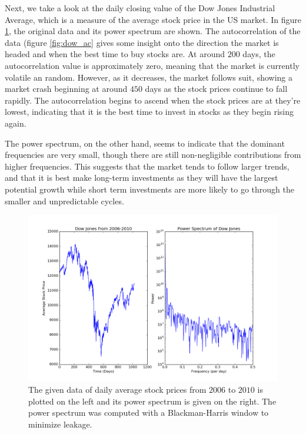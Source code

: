 \documentclass[twocolumn]{article}
\begin{document}
Next, we take a look at the daily closing value of the Dow Jones
Industrial Average, which is a measure of the average stock price in
the US market. In figure \ref{fig:dow}, the original data and its
power spectrum are shown. The autocorrelation of the data (figure
\ref{fig:dow_ac} gives some insight onto the direction the market is
headed and when the best time to buy stocks are. At around $200$ days,
the autocorrelation value is approximately zero, meaning that the
market is currently volatile an random. However, as it decreases, the
market follows suit, showing a market crash beginning at around $450$
days as the stock prices continue to fall rapidly. The autocorrelation
begins to ascend when the stock prices are at they're lowest,
indicating that it is the best time to invest in stocks as they begin
rising again.

The power spectrum, on the other hand, seems to indicate
that the dominant frequencies are very small, though there are still
non-negligible contributions from higher frequencies. This suggests
that the market tends to follow larger trends, and that it is best
make long-term investments as they will have the largest potential
growth while short term investments are more likely to go through the
smaller and unpredictable cycles.

\begin{figure}[t]
  \includegraphics[width=\linewidth]{dow.png}
  \caption{
    The given data of daily average stock prices from $2006$ to $2010$
    is plotted on the left and its power spectrum is given on the
    right. The power spectrum was computed with a Blackman-Harris
    window to minimize leakage.
  }
  \label{fig:dow}
\end{figure}
\end{document}
